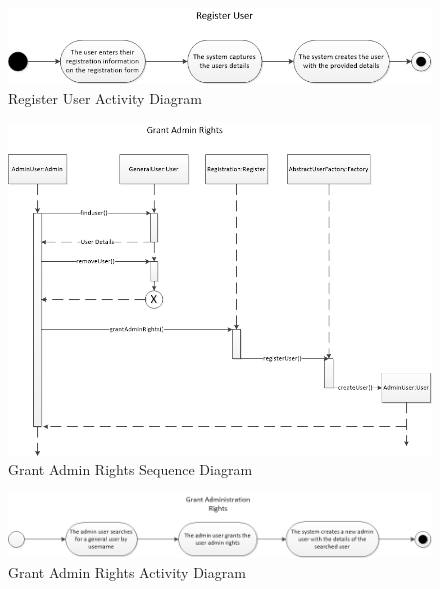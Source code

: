 \documentclass{article}
\begin{document}
    \clearpage
    
    \begin{figure}[h!]
      \includegraphics[width=\textwidth]{User/img/Register_User_Activity_Diagram.png}
      \caption{Register User Activity Diagram}
    \end{figure}
    
    \begin{figure}[h!]
      \includegraphics[width=\textwidth]{User/img/Grant_Admin_Rights_Sequence_Diagram.png}
      \caption{Grant Admin Rights Sequence Diagram}
    \end{figure}
    
    \begin{figure}[h!]
      \includegraphics[width=\textwidth]{User/img/Grant_Admin_Rights_Activity_Diagram.png}
      \caption{Grant Admin Rights Activity Diagram}
    \end{figure}
    
\end{document}
